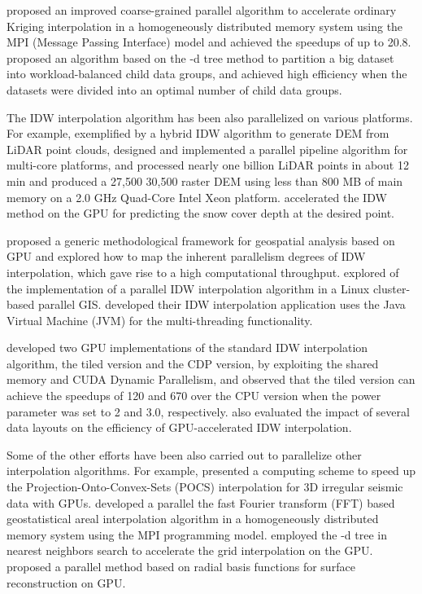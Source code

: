 \documentclass[final,5p,times,twocolumn,authoryear]{elsarticle}
\begin{document}
\cite{13DBLP:journals/gandc/HuS15} proposed an improved coarse-grained parallel 
algorithm to accelerate ordinary Kriging interpolation in a homogeneously 
distributed memory system using the MPI (Message Passing Interface) model 
and achieved the speedups of up to 20.8. \cite{14doi:10.1080/15481603.2014.1002379} 
proposed an algorithm based on the -d tree method to partition a big dataset 
into workload-balanced child data groups, and achieved high efficiency when 
the datasets were divided into an optimal number of child data groups.

The IDW interpolation algorithm has been also parallelized on various 
platforms. For example, exemplified by a hybrid IDW algorithm to generate 
DEM from LiDAR point clouds, \cite{15DBLP:journals/gandc/GuanW10} designed and 
implemented a parallel pipeline algorithm for multi-core platforms, and 
processed nearly one billion LiDAR points in about 12 min and produced a 
27,500  30,500 raster DEM using less than 800 MB of main memory on a 
2.0 GHz Quad-Core Intel Xeon platform. \cite{16,17} accelerated the 
IDW method on the GPU for predicting the snow cover depth at the desired 
point.

\cite{18,19DBLP:journals/jzusc/XiaKL11} proposed a generic methodological framework for geospatial 
analysis based on GPU and explored how to map the inherent parallelism 
degrees of IDW interpolation, which gave rise to a high computational 
throughput. \cite{20DBLP:journals/gandc/HuangLTWCH11} explored of the implementation of a 
parallel IDW interpolation algorithm in a Linux cluster-based parallel GIS. 
\cite{21} developed their IDW interpolation application uses the 
Java Virtual Machine (JVM) for the multi-threading functionality.

\cite{22ISI:000332539900001} developed two GPU implementations of the standard IDW 
interpolation algorithm, the tiled version and the CDP version, by 
exploiting the shared memory and CUDA Dynamic Parallelism, and observed that 
the tiled version can achieve the speedups of 120 and 670 over the CPU 
version when the power parameter was set to 2 and 3.0, respectively. \cite{23} 
also evaluated the impact of several data layouts on the efficiency of 
GPU-accelerated IDW interpolation.

Some of the other efforts have been also carried out to parallelize other 
interpolation algorithms. For example, \cite{24DBLP:journals/gandc/WangGY10} presented a 
computing scheme to speed up the Projection-Onto-Convex-Sets (POCS) 
interpolation for 3D irregular seismic data with GPUs. \cite{25DBLP:journals/gis/GuanKG11}
developed a parallel the fast Fourier transform (FFT) based 
geostatistical areal interpolation algorithm in a homogeneously distributed 
memory system using the MPI programming model. \cite{26DBLP:journals/esi/HuangCCLW12}
employed the -d tree in nearest neighbors search to accelerate the grid 
interpolation on the GPU. \cite{27DBLP:conf/fedcsis/CuomoGGS13} proposed a parallel method 
based on radial basis functions for surface reconstruction on GPU. 
\end{document}
